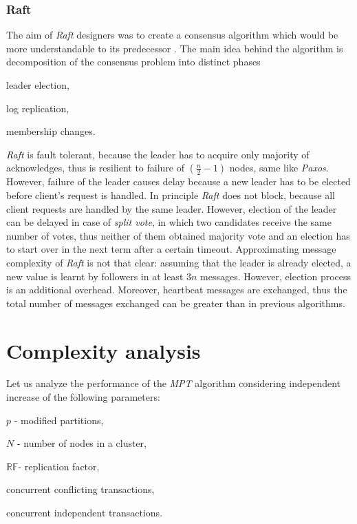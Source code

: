 \documentclass[runningheads,a4paper]{llncs}
\newcommand{\paxos}{\emph{Paxos}\xspace}
\newcommand{\mpt}{\emph{MPT}\xspace}
\newcommand{\RFalone}{$\mathbb{RF}$\xspace}
\begin{document}
\subsubsection{Raft}

The aim of \emph{Raft} designers was to create a consensus algorithm which would be more understandable to its predecessor \cite{ongaro2014search}. The main idea behind the algorithm is decomposition of the consensus problem into distinct phases \begin{enumerate*}[label=\alph*)]
  \item leader election,
  \item log replication,
  \item membership changes.
\end{enumerate*} 
\emph{Raft} is fault tolerant, because the leader has to acquire only majority of acknowledges, thus is resilient to failure of $(\frac{n}{2}-1)$ nodes, same like \paxos. However, failure of the leader causes delay because a new leader has to be elected before client's request is handled. In principle \emph{Raft} does not block, because all client requests are handled by the same leader. However, election of the leader can be delayed in case of \emph{split vote}, in which two candidates receive the same number of votes, thus neither of them obtained majority vote and an election has to start over in the next term after a certain timeout. Approximating message complexity of \emph{Raft} is not that clear: assuming that the leader is already elected, a new value is learnt by followers in at least $3n$ messages. However, election process is an additional overhead. Moreover, heartbeat messages are exchanged, thus the total number of messages exchanged can be greater than in previous algorithms.

\section{Complexity analysis}

Let us analyze the performance of the \mpt algorithm considering independent increase of the following parameters: 
\begin{enumerate*}[label=\alph*)]
\item $p$ - modified partitions,
\item $N$ - number of nodes in a cluster,
\item \RFalone - replication factor,
\item concurrent conflicting transactions,
\item concurrent independent transactions.
\end{enumerate*}
\end{document}
